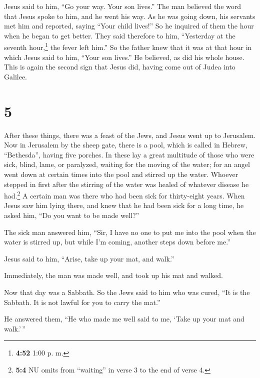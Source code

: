  Jesus said to him, ``Go your way. Your son lives.'' The
man believed the word that Jesus spoke to him, and he went his way.
 As he was going down, his servants met him and reported,
saying ``Your child lives!''  So he inquired of them the
hour when he began to get better. They said therefore to him,
``Yesterday at the seventh hour,\footnote{\textbf{4:52} 1:00 p. m.} the
fever left him.''  So the father knew that it was at that
hour in which Jesus said to him, ``Your son lives.'' He believed, as did
his whole house.  This is again the second sign that
Jesus did, having come out of Judea into Galilee.

\hypertarget{section-4}{%
\section{5}\label{section-4}}

 After these things, there was a feast of the Jews, and
Jesus went up to Jerusalem.  Now in Jerusalem by the sheep
gate, there is a pool, which is called in Hebrew, ``Bethesda'', having
five porches.  In these lay a great multitude of those who
were sick, blind, lame, or paralyzed, waiting for the moving of the
water;  for an angel went down at certain times into the
pool and stirred up the water. Whoever stepped in first after the
stirring of the water was healed of whatever disease he had.\footnote{\textbf{5:4}
  NU omits from ``waiting'' in verse 3 to the end of verse 4.}
 A certain man was there who had been sick for
thirty-eight years.  When Jesus saw him lying there, and
knew that he had been sick for a long time, he asked him, ``Do you want
to be made well?''

 The sick man answered him, ``Sir, I have no one to put me
into the pool when the water is stirred up, but while I'm coming,
another steps down before me.''

 Jesus said to him, ``Arise, take up your mat, and walk.''

 Immediately, the man was made well, and took up his mat
and walked.

Now that day was a Sabbath.  So the Jews said to him who
was cured, ``It is the Sabbath. It is not lawful for you to carry the
mat.''

 He answered them, ``He who made me well said to me,
`Take up your mat and walk.'\,''

